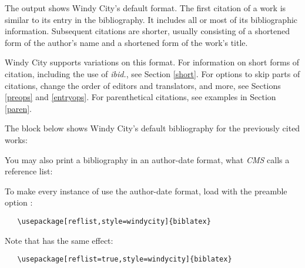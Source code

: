 \documentclass[11pt,letterpaper,oneside]{article}
\begin{document}
\begin{citeonly}
\item \cite[24--25]{morley1995}
\item \cite{schwartz1992}
\item \cite{kaiser1964}
\item \cite[43]{morley1995}
\item \cite[138]{schwartz1992}
\item \cite[189--90]{kaiser1964}
\end{citeonly}

The output shows Windy City's default format. The first citation of a
work is similar to its entry in the bibliography. It includes all or
most of its bibliographic information. Subsequent citations are
shorter, usually consisting of a shortened form of the author's name
and a shortened form of the work's title.

Windy City supports variations on this format. For information on
short forms of citation, including the use of \textit{ibid.}, see
Section \ref{short}. For options to skip parts of citations, change
the order of editors and translators, and more, see Sections
\ref{preops} and \ref{entryops}. For parenthetical citations, see
examples in Section \ref{paren}.

The block below shows Windy City's default bibliography for the
previously cited works:

\begin{bibonly}
\nocite{kaiser1964,morley1995,schwartz1992}
\end{bibonly}

\noindent You may also print a bibliography in an author-date format,
what \textit{CMS} calls a reference list:

\begin{refonly}
\nocite{kaiser1964,morley1995,schwartz1992}
\end{refonly}

To make every instance of  use the author-date
format, load \biblatex with the preamble option :

\begin{verbatim}
   \usepackage[reflist,style=windycity]{biblatex}
\end{verbatim}

\noindent Note that  has the same effect:

\begin{verbatim}
   \usepackage[reflist=true,style=windycity]{biblatex}
\end{verbatim}
\end{document}
